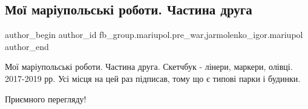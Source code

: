  
 
 
 
 

\subsection{Мої маріупольські роботи. Частина друга}
\label{sec:14_01_2023.fb.fb_group.mariupol.pre_war.1.mo__mar_upolsk__robo}
 
\ifcmt
 author_begin
   author_id fb_group.mariupol.pre_war,jarmolenko_igor.mariupol
 author_end
\fi

Мої маріупольські роботи. Частина друга. Скетчбук - лінери, маркери, олівці.
2017-2019 рр. Усі місця на цей раз підписав, тому що є типові парки і будинки.

Приємного перегляду!
